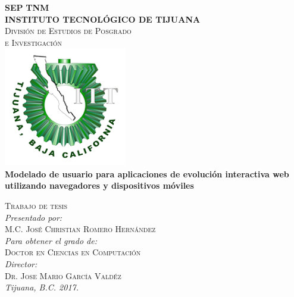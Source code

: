 \documentclass{article}
\begin{document}
\begin{center}
{\textsc{\LARGE \textbf{SEP} } \hfill  \textsc{\LARGE \textbf{TNM}}}\\[0.2cm]
	\textsc{\LARGE \textbf{INSTITUTO TECNOL\'OGICO DE TIJUANA}\\[0.5cm]
	\textsc{\Large Divisi\'on de Estudios de Posgrado }\\[0.1cm]
	\textsc{\Large e Investigaci\'on }}\\[0.5cm]
	\includegraphics[width=0.4\textwidth]{img/logotec1}\\[0.3cm] %
	{ \LARGE \bfseries Modelado de usuario para aplicaciones de evoluci\'on interactiva web utilizando navegadores y dispositivos m\'oviles}\\ [1.0cm]
\end{center}

 \begin{minipage}{1.0\textwidth}
 	\begin{flushright}
 	\textsc{Trabajo de tesis}\\[0.3cm]
 	\emph{Presentado por:} \\
 	\textsc{ M.C. Jos\'e Christian Romero Hern\'andez}\\
	\emph{Para obtener el grado de:} \\
 	\textsc{Doctor en Ciencias en Computaci\'on} \\
	\emph{Director:} \\
 	\textsc{Dr. Jose Mario Garc\'ia Vald\'ez} \\
 	\vspace{4 mm}
	\emph{Tijuana, B.C. 2017.}
 	\end{flushright}
\end{minipage}


\pagestyle{empty} %
\end{document}

